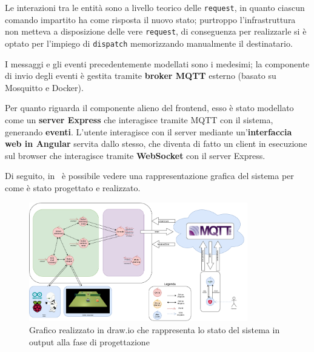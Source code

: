 \documentclass{llncs}
\begin{document}
Le interazioni tra le entità sono a livello teorico delle \texttt{request}, in quanto ciascun comando impartito ha come risposta il nuovo stato;
purtroppo l'infrastruttura non metteva a disposizione delle vere \texttt{request}, di conseguenza per realizzarle si è optato per l'impiego di \texttt{dispatch} memorizzando manualmente il destinatario.

I messaggi e gli eventi precedentemente modellati sono i medesimi;
la componente di invio degli eventi è gestita tramite \textbf{broker MQTT} esterno (basato su Mosquitto e Docker).

Per quanto riguarda il componente alieno del frontend, esso è stato modellato come un \textbf{server Express} che interagisce tramite MQTT con il sistema, generando \textbf{eventi}.
L'utente interagisce con il server mediante un'\textbf{interfaccia web in Angular} servita dallo stesso, che diventa di fatto un client in esecuzione sul browser che interagisce tramite \textbf{WebSocket} con il server Express.

Di seguito, in~ è possibile vedere una rappresentazione grafica del sistema per come è stato progettato e realizzato.

\begin{figure}[h]
  \centering%
  \includegraphics[width=0.85\textwidth]{res/project}%
  \caption{Grafico realizzato in draw.io che rappresenta lo stato del sistema in output alla fase di progettazione}%
  \label{fig:project}
\end{figure}
\end{document}
